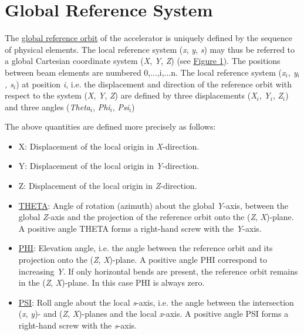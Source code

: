 
\section{Global Reference System}
\label{sec:global_ref}

The \hyperlink{global}{global reference orbit} of the accelerator is
uniquely defined by the sequence of physical elements. The local
reference system (\textit{x}, \textit{y}, \textit{s}) may thus be
referred to a global Cartesian coordinate system (\textit{X},
\textit{Y}, \textit{Z}) (see \hyperlink{global}{Figure 1}). The
positions between beam elements are numbered 0,...,i,...n. The local
reference system  (\textit{x$_i$, y$_i$, s$_i$}) at position \textit{i},
i.e. the displacement and direction of the reference orbit with respect
to the system (\textit{X}, \textit{Y}, \textit{Z}) are defined by three
displacements  (\textit{X$_i$}, \textit{Y$_i$}, \textit{Z$_i$}) and
three angles (\textit{Theta$_i$}, \textit{Phi$_i$}, \textit{Psi$_i$})

The above quantities are defined more precisely as follows:  
\begin{itemize}
   \item X: Displacement of the local origin in \textit{X}-direction. 
   \item Y: Displacement of the local origin in \textit{Y}-direction. 
   \item Z: Displacement of the local origin in \textit{Z}-direction. 
   \item \href{theta}{THETA}: Angle of rotation (azimuth) about the
     global \textit{Y}-axis, between the global \textit{Z}-axis and the
     projection of the reference orbit onto the (\textit{Z},
     \textit{X})-plane. A positive angle THETA forms a right-hand screw
     with the \textit{Y}-axis. 
   \item \href{phi}{PHI}: Elevation angle, i.e. the angle between the
     reference orbit and its projection onto the (\textit{Z},
     \textit{X})-plane. A positive angle PHI correspond to increasing
     \textit{Y}. If only horizontal bends are present, the reference
     orbit remains in the (\textit{Z}, \textit{X})-plane. In this case
     PHI is always zero. 
   \item \href{psi}{PSI}: Roll angle about the local \textit{s}-axis,
     i.e. the angle between the intersection (\textit{x}, \textit{y})-
     and (\textit{Z}, \textit{X})-planes and the local
     \textit{x}-axis. A positive angle PSI forms a right-hand screw with
     the \textit{s}-axis. 
\end{itemize} 

